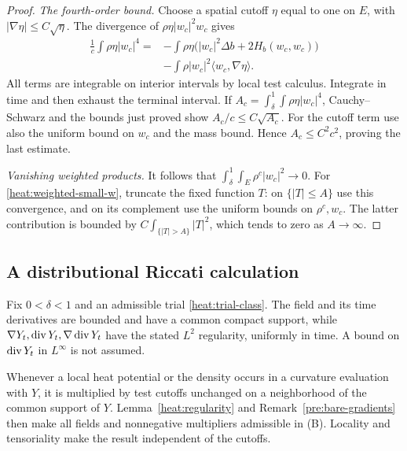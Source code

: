 \begin{proof}
\emph{The fourth-order bound.}
Choose a spatial cutoff \(\eta\) equal to one on \(E\), with
\(|\nabla\eta|\le C\sqrt\eta\). The divergence of
\(\rho\eta|w_c|^2w_c\) gives
\begin{align*}
\frac1c\int\rho\eta|w_c|^4
={}&-\int\rho\eta\bigl(|w_c|^2\Delta b
+2H_b(w_c,w_c)\bigr)\\
&-\int\rho|w_c|^2\langle w_c,\nabla\eta\rangle.
\end{align*}
All terms are integrable on interior intervals by local test
calculus. Integrate in time and then exhaust the terminal
interval. If \(A_c=\int_\delta^1\int\rho\eta|w_c|^4\),
Cauchy--Schwarz and the bounds just proved show
\(A_c/c\le C\sqrt{A_c}\). For the cutoff term use also
the uniform bound on \(w_c\) and the mass bound. Hence
\(A_c\le C^2c^2\), proving the last estimate.

\emph{Vanishing weighted products.}
It follows that \(\int_\delta^1\int_E\rho^c|w_c|^2\to0\).
For \eqref{heat:weighted-small-w}, truncate the fixed function
\(T\): on \(\{|T|\le A\}\) use this convergence, and on
its complement use the uniform bounds on \(\rho^c,w_c\).
The latter contribution is bounded by
\(C\int_{\{|T|>A\}}|T|^2\), which tends to zero as
\(A\to\infty\).
\end{proof}

\subsection{A distributional Riccati calculation}

Fix \(0<\delta<1\) and an admissible trial
\eqref{heat:trial-class}. The field and its time derivatives
are bounded and have a common compact support, while
\(\nabla Y_t,\operatorname{div} Y_t,\nabla\operatorname{div} Y_t\) have the stated
\(L^2\) regularity, uniformly in time. A bound on
\(\operatorname{div} Y_t\) in \(L^\infty\) is not assumed.

Whenever a local heat potential or the density occurs in a
curvature evaluation with \(Y\), it is multiplied by test
cutoffs unchanged on a neighborhood of the common support of
\(Y\). Lemma~\ref{heat:regularity} and
Remark~\ref{pre:bare-gradients} then make all fields and
nonnegative multipliers admissible in \textup{(B)}. Locality
and tensoriality make the result independent of the cutoffs.

